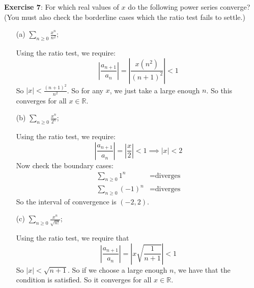 \documentclass{article}
\begin{document}
\textbf{Exercise 7}: For which real values of $x$ do the following power series converge? (You must also check the borderline cases which the ratio test fails to settle.)
    \begin{itemize}
        \item [(a)] $\sum_{n \geq 0}\frac{x^{n}}{n^{2}}$;
            \begin{answer}
                Using the ratio test, we require:
                    \begin{equation*}
                        \left\lvert \dfrac{a_{n + 1}}{a_{n}} \right\rvert = \left\lvert \dfrac{x(n^{2})}{(n + 1)^{2}} \right\rvert < 1
                    \end{equation*}
                So $\lvert x \rvert < \frac{(n + 1)^{2}}{n^{2}}$. So for any $x$, we just take a large enough $n$. So this converges for all $x \in \mathbb{R}$.
            \end{answer}

        \item [(b)] $\sum_{n \geq 0} \frac{x^{n}}{2^{n}}$;
            \begin{answer}
                Using the ratio test, we require:
                    \begin{equation*}
                        \left\lvert \dfrac{a_{n + 1}}{a_{n}} \right\rvert = \left\lvert \dfrac{x}{2} \right\rvert < 1 \implies \lvert x \rvert < 2
                    \end{equation*}
                Now check the boundary cases:  
                    \begin{align*}
                        \sum_{n \geq 0} 1^{n}    &= \text{diverges} \\
                        \sum_{n \geq 0} (-1)^{n} &= \text{diverges}   
                    \end{align*}
                So the interval of convergence is $(-2, 2)$.
            \end{answer}

        \item [(c)] $\sum_{n \geq 0}\frac{x^{n}}{\sqrt{n!}}$;
            \begin{answer}
                Using the ratio test, we require that
                    \begin{equation*}
                        \left\lvert \dfrac{a_{n + 1}}{a_{n}} \right\rvert = \left\lvert x\sqrt{\dfrac{1}{n + 1}} \right\rvert < 1
                    \end{equation*}
                So $\lvert x \rvert < \sqrt{n + 1}$. So if we choose a large enough $n$, we have that the condition is satisfied. So it converges for all $x \in \mathbb{R}$.
            \end{answer}


\end{itemize}
\end{document}
